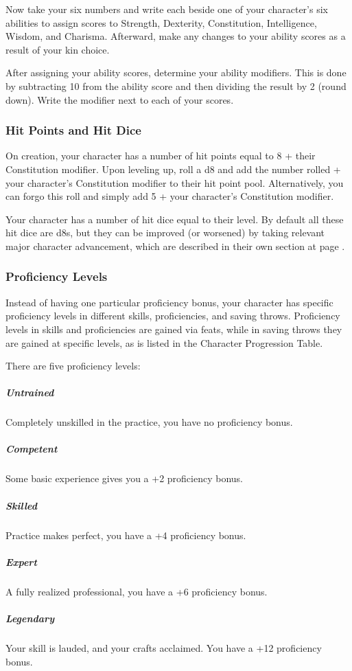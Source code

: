         Now take your six numbers and write each beside one of your character's six abilities to assign scores to Strength, Dexterity, Constitution, Intelligence, Wisdom, and Charisma.
        Afterward, make any changes to your ability scores as a result of your kin choice.

        After assigning your ability scores, determine your ability modifiers.
        This is done by subtracting 10 from the ability score and then dividing the result by 2 (round down).
        Write the modifier next to each of your scores.

    \subsubsection{Hit Points and Hit Dice}
        On creation, your character has a number of hit points equal to 8 + their Constitution modifier.
        Upon leveling up, roll a d8 and add the number rolled + your character's Constitution modifier to their hit point pool.
        Alternatively, you can forgo this roll and simply add 5 + your character's Constitution modifier.

        Your character has a number of hit dice equal to their level.
        By default all these hit dice are d8s, but they can be improved (or worsened) by taking relevant major character advancement, which are described in their own section at page \pageref{sec::majorcharacteradvancement}.

    \subsubsection{Proficiency Levels}
        Instead of having one particular proficiency bonus, your character has specific proficiency levels in different skills, proficiencies, and saving throws.
        Proficiency levels in skills and proficiencies are gained via feats, while in saving throws they are gained at specific levels, as is listed in the Character Progression Table.

        There are five proficiency levels:
        \subparagraph{Untrained} Completely unskilled in the practice, you have no proficiency bonus.
        \subparagraph{Competent} Some basic experience gives you a +2 proficiency bonus.
        \subparagraph{Skilled} Practice makes perfect, you have a +4 proficiency bonus.
        \subparagraph{Expert} A fully realized professional, you have a +6 proficiency bonus.
        \subparagraph{Legendary} Your skill is lauded, and your crafts acclaimed.
        You have a +12 proficiency bonus.

